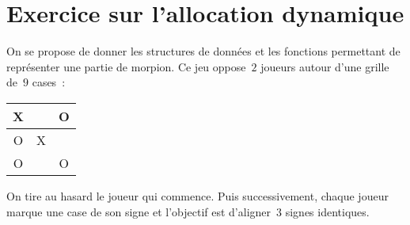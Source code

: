 
\section{Exercice sur l'allocation dynamique}
On se propose de donner les structures de donn\'ees et les fonctions
permettant de repr\'esenter une partie de morpion. Ce jeu oppose~$2$
joueurs autour d'une grille de~$9$ cases~:
\begin{center}
  \begin{tabular}{|c|c|c|}
    \hline 
    X & & O   \\  \hline 
    O & X & \\    \hline
    O &  & O   \\  \hline
    \end{tabular}
\end{center}
On tire au hasard le joueur qui commence. Puis successivement, chaque
joueur marque une case de son signe et l'objectif est d'aligner~$3$
signes identiques.

